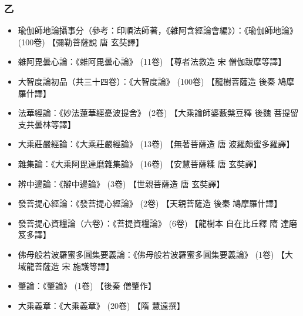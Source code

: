 \subsubsection{乙}
\begin{itemize}
  \item 瑜伽師地論攝事分（參考：印順法師著，《雜阿含經論會編》）：《瑜伽師地論》 (100卷) 【彌勒菩薩說 唐 玄奘譯】
  \item 雜阿毘曇心論：《雜阿毘曇心論》 (11卷) 【尊者法救造 宋 僧伽跋摩等譯】
  \item 大智度論初品（共三十四卷）：《大智度論》 (100卷) 【龍樹菩薩造 後秦 鳩摩羅什譯】
  \item 法華經論：《妙法蓮華經憂波提舍》 (2卷) 【大乘論師婆藪槃豆釋 後魏 菩提留支共曇林等譯】
  \item 大乘莊嚴經論：《大乘莊嚴經論》 (13卷) 【無著菩薩造 唐 波羅頗蜜多羅譯】
  \item 雜集論：《大乘阿毘達磨雜集論》 (16卷) 【安慧菩薩糅 唐 玄奘譯】
  \item 辨中邊論：《辯中邊論》 (3卷) 【世親菩薩造 唐 玄奘譯】
  \item 發菩提心經論：《發菩提心經論》 (2卷) 【天親菩薩造 後秦 鳩摩羅什譯】
  \item 發菩提心資糧論（六卷）：《菩提資糧論》 (6卷) 【龍樹本 自在比丘釋 隋 達磨笈多譯】
  \item 佛母般若波羅蜜多圓集要義論：《佛母般若波羅蜜多圓集要義論》 (1卷) 【大域龍菩薩造 宋 施護等譯】
  \item 肇論：《肇論》 (1卷) 【後秦 僧肇作】
  \item 大乘義章：《大乘義章》 (20卷) 【隋 慧遠撰】
\end{itemize}
